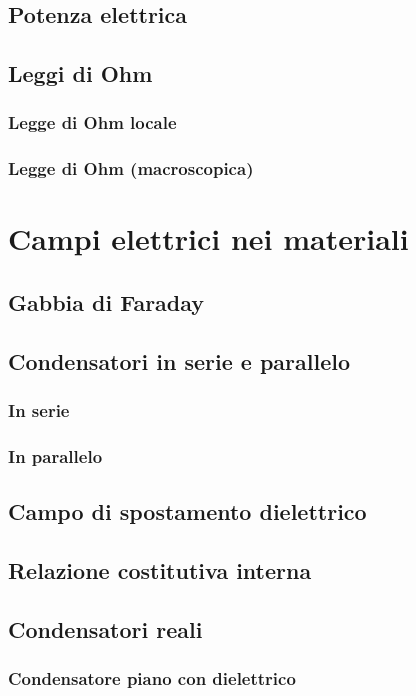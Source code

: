 \documentclass{book}
\begin{document}
\section{Potenza elettrica}
\section{Leggi di Ohm}
\subsection{Legge di Ohm locale}
\subsection{Legge di Ohm (macroscopica)}

\chapter{Campi elettrici nei materiali}
\section{Gabbia di Faraday}
\section{Condensatori in serie e parallelo}
\subsection{In serie}
\subsection{In parallelo}
\section{Campo di spostamento dielettrico}
\section{Relazione costitutiva interna}
\section{Condensatori reali}

\subsection{Condensatore piano con dielettrico}
\end{document}
